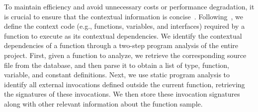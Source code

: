 To maintain efficiency and avoid unnecessary costs or performance degradation, it is crucial to ensure that the contextual information is concise~\cite{A3CodGen}. 
Following~\cite{yu2024codereval}, we define the context code (e.g., functions, variables, and interfaces) required by a function to execute as its contextual dependencies.
We identify the contextual dependencies of a function through a two-step program analysis of the entire project.
First, given a function to analyze, we retrieve the corresponding source file from the database, and then parse it to obtain a list of type, function, variable, and constant definitions. 
Next, we use static program analysis to identify all external invocations defined outside the current function, retrieving the signatures of these invocations. 
We then store these invocation signatures along with other relevant information about the function sample.